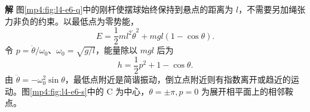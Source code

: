 \documentclass[11pt,openany,fontset=fandol]{ctexbook}
\theoremstyle{definition}\newtheorem{example}{例}[chapter]\newtheorem{exercise}{习题}[chapter]
\newcommand{\SolutionStart}{\par\medskip\ifdim\pagetotal>0pt\ifdim\dimexpr\pagegoal-\pagetotal\relax<3\baselineskip\newpage\fi\fi\noindent\textbf{解}\quad\ignorespaces}
\newenvironment{solution}{\SolutionStart}{\par\medskip}
\begin{document}
\begin{solution}
图\ref{mp4:fig:l4-e6-q}中的刚杆使摆球始终保持到悬点的距离为 $l$，不需要另加绳张力非负的约束。以最低点为零势能，
\[
E=\frac12ml^2\dot\theta^2+mgl(1-\cos\theta).
\]
令 $p=\dot\theta/\omega_0$、$\omega_0=\sqrt{g/l}$，能量除以 $mgl$ 后为
\begin{equation}\label{mp4:eq:l4-pendulum}
h=\frac12p^2+1-\cos\theta.
\end{equation}
由 $\ddot\theta=-\omega_0^2\sin\theta$，最低点附近是简谐振动，倒立点附近则有指数离开或趋近的运动。图\ref{mp4:fig:l4-e6-s}中的 C 为中心，$\theta=\pm\pi,p=0$ 为展开相平面上的相邻鞍点。

\begin{figure}[H]\centering
{}
\end{figure}
\end{solution}
\end{document}
